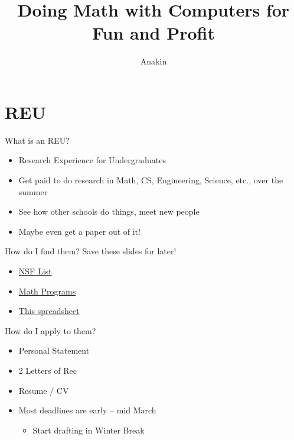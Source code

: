 \documentclass[aspectratio=169]{beamer}
\title{Doing Math with Computers for Fun and Profit}
\subtitle{\cite{classifying}}
\author{Anakin}
\date{}
\begin{document}

\begin{frame}
\titlepage
\end{frame}

\section{REU}
\frame{\sectionpage}

\begin{frame}{What is an REU?}
    \begin{itemize}
        \item Research Experience for Undergraduates \pause
        \item Get paid to do research in Math, CS, Engineering, Science, etc., over the summer \pause
        \item See how other schools do things, meet new people \pause
        \item Maybe even get a paper out of it!
    \end{itemize}
\end{frame}

\begin{frame}{How do I find them?}
    Save these slides for later!
    \begin{itemize}
        \item \href{https://www.nsf.gov/crssprgm/reu/reu_search.jsp}{NSF List}
        \item \href{https://www.mathprograms.org/db?joblist-0-0----p--}{Math Programs}
        \item \href{https://docs.google.com/spreadsheets/d/1U-27BeHMSJCWumbNByal2tHyYo9wRVud9WoRE70E47Y/edit\#gid=1262276228}{This spreadsheet}
    \end{itemize}
\end{frame}

\begin{frame}{How do I apply to them?}
    \begin{itemize}
        \item Personal Statement \pause
        \item 2 Letters of Rec \pause
        \item Resume / CV \pause
        \item Most deadlines are early -- mid March
        \begin{itemize}
            \item Start drafting in Winter Break
        \end{itemize}
    \end{itemize}
\end{frame}
\end{document}
